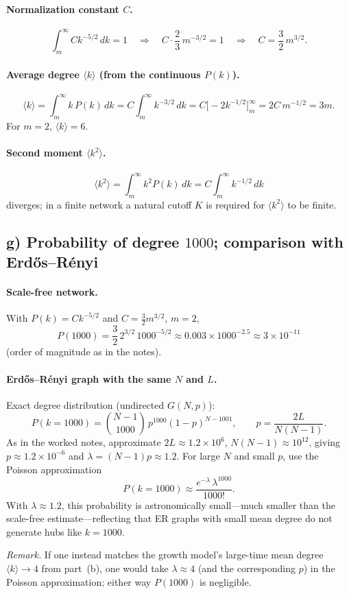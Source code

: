 \documentclass[11pt,a4paper]{article}
\begin{document}
\paragraph{Normalization constant $C$.}
\[
  \int_m^{\infty} C k^{-5/2}\,dk = 1
  \quad\Rightarrow\quad
  C\cdot \frac{2}{3}\,m^{-3/2} = 1
  \quad\Rightarrow\quad
  C = \frac{3}{2}\,m^{3/2}.
\]

\paragraph{Average degree $\langle k \rangle$ (from the continuous $P(k)$).}
\[
  \langle k \rangle = \int_m^{\infty} k\,P(k)\,dk
  = C \int_m^{\infty} k^{-3/2}\,dk
  = C \bigl[-2 k^{-1/2}\bigr]_m^{\infty}
  = 2 C\,m^{-1/2}
  = 3m.
\]
For $m=2$, $\langle k \rangle = 6$.

\paragraph{Second moment $\langle k^2 \rangle$.}
\[
  \langle k^2 \rangle = \int_m^{\infty} k^2 P(k)\,dk
  = C \int_m^{\infty} k^{-1/2}\,dk
\]
diverges; in a finite network a natural cutoff $K$ is required for $\langle k^2 \rangle$ to be finite.

\subsection*{g) Probability of degree $1000$; comparison with Erd\H{o}s--R\'enyi}

\paragraph{Scale-free network.}
With $P(k) = C k^{-5/2}$ and $C = \frac{3}{2} m^{3/2}$, $m=2$,
\[
  P(1000) = \frac{3}{2}\,2^{3/2}\,1000^{-5/2}
  \approx 0.003 \times 1000^{-2.5}
  \approx 3\times 10^{-11}
\]
(order of magnitude as in the notes).

\paragraph{Erd\H{o}s--R\'enyi graph with the same $N$ and $L$.}
Exact degree distribution (undirected $G(N,p)$):
\[
  P(k=1000) = \binom{N-1}{1000}\,p^{1000}(1-p)^{N-1001},
  \qquad
  p = \frac{2L}{N(N-1)}.
\]
As in the worked notes, approximate $2L \approx 1.2\times 10^{6}$, $N(N-1)\approx 10^{12}$, giving $p \approx 1.2\times 10^{-6}$ and $\lambda = (N-1)p \approx 1.2$. For large $N$ and small $p$, use the Poisson approximation
\[
  P(k=1000) \approx \frac{e^{-\lambda}\,\lambda^{1000}}{1000!}.
\]
With $\lambda\approx 1.2$, this probability is astronomically small---much smaller than the scale-free estimate---reflecting that ER graphs with small mean degree do not generate hubs like $k=1000$.

\medskip
\noindent\textit{Remark.} If one instead matches the growth model's large-time mean degree $\langle k\rangle\to 4$ from part~(b), one would take $\lambda\approx 4$ (and the corresponding $p$) in the Poisson approximation; either way $P(1000)$ is negligible.
\end{document}
